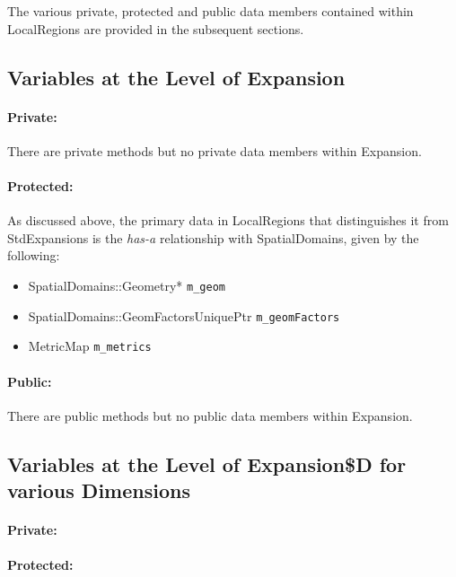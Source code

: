 The various private, protected and public data members contained within LocalRegions are provided in the subsequent sections.

\subsection{Variables at the Level of Expansion}

\paragraph{Private:}

There are private methods but no private data members within Expansion.

\paragraph{Protected:}

As discussed above, the primary data in LocalRegions that distinguishes it from StdExpansions is the {\em has-a} relationship with SpatialDomains, given by the following:

\begin{itemize}
\item SpatialDomains::Geometry*  \verb+m_geom+
%
\item SpatialDomains::GeomFactorsUniquePtr \verb+m_geomFactors+
%
\item MetricMap \verb+m_metrics+
\end{itemize}


\paragraph{Public:}

There are public methods but no public data members within Expansion.


\subsection{Variables at the Level of Expansion\$D for various Dimensions}
\paragraph{Private:}

\paragraph{Protected:}

